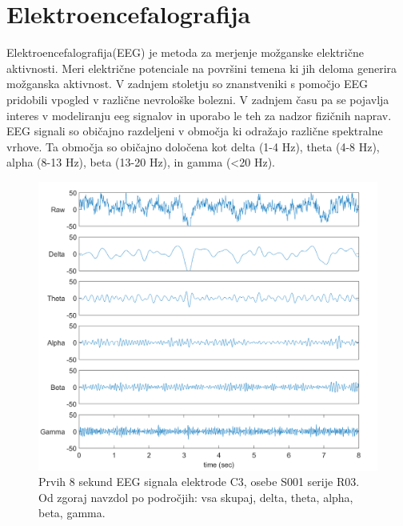 \section{Elektroencefalografija}
Elektroencefalografija(EEG) je metoda za merjenje možganske električne aktivnosti. Meri električne potenciale na površini temena ki jih deloma generira možganska aktivnost. V zadnjem stoletju so znanstveniki s pomočjo EEG pridobili vpogled v različne nevrološke bolezni. V zadnjem času pa se pojavlja interes v modeliranju eeg signalov in uporabo le teh za nadzor fizičnih naprav. EEG signali so običajno razdeljeni v območja ki odražajo različne spektralne vrhove. Ta območja so običajno določena kot delta (1-4 Hz), theta (4-8 Hz), alpha (8-13 Hz), beta (13-20 Hz), in gamma (<20 Hz). 
 \cite{nunez_electroencephalography_2016}
 \begin{figure}[h!]
    \begin{center}
    \includegraphics[width=1\linewidth]{slike/EEGSignals.png}
    \end{center}
    \caption{Prvih 8 sekund EEG signala elektrode C3, osebe S001 serije R03. Od zgoraj navzdol po področjih: vsa skupaj, delta, theta, alpha, beta, gamma.}
    \end{figure}


